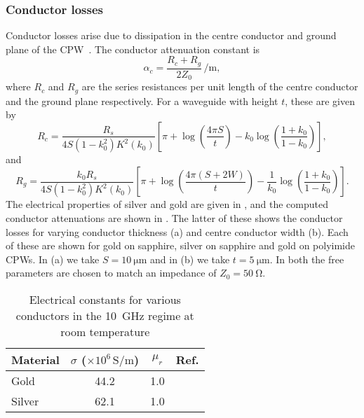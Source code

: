 \subsubsection{Conductor losses}

Conductor losses arise due to dissipation in the centre conductor and ground
plane of the CPW~\cite{Simons2004}.  The conductor attenuation constant is
%
\begin{equation}
  \alpha_c = \frac{R_c +R_g}{2Z_0}\,\si{\per\meter},
\end{equation}
%
where $R_c$ and $R_g$ are the series resistances per unit length of the centre
conductor and the ground plane respectively.
%
For a waveguide with height $t$, these are given by
%
\begin{equation}
  R_c = \frac{R_s}{4 S(1-k_0^2)K^2(k_0)}\left[ \pi + \log\left(\frac{4\pi
  S}{t}\right) - k_0\log\left(\frac{1+k_0}{1-k_0}\right) \right],
\end{equation}
%
and
%
\begin{equation}
  R_g = \frac{k_0 R_s}{4S(1-k_0^2)K^2(k_0)}\left[\pi +
  \log\left(\frac{4\pi(S+2W)}{t}\right) -
  \frac{1}{k_0}\log\left(\frac{1+k_0}{1-k_0}\right)\right].
\end{equation}
%
The electrical properties of silver and gold are given in
, and the computed conductor attenuations are
shown in . The latter of these shows the
conductor losses for varying conductor thickness (a) and centre conductor width
(b). Each of these are shown for gold on sapphire, silver on sapphire and gold
on polyimide CPWs. In (a) we take $S=\SI{10}{\micro\meter}$ and in (b) we take
$t=\SI{5}{\micro\meter}$. In both the free parameters are chosen to match an
impedance of $Z_0=\SI{50}{\ohm}$.

% 
\begin{table}[tb!]
  \caption[Various electrical constants]{Electrical constants for various conductors in the
  \SI{10}{\giga\hertz} regime at room temperature}
\centering
\begin{tabular}{l c c c}
\hline\hline
Material & $\sigma$ ($\times10^6\,\si{\siemens\per\meter}$) & $\mu_r$ & Ref. \\ [ 0.5ex]
\hline
  Gold & 44.2 & 1.0 & \cite{edwards2016foundations}\\
  Silver & 62.1 & 1.0 & \cite{edwards2016foundations}\\
\hline
\end{tabular}
\label{mws:table:metalprops}
\end{table}

